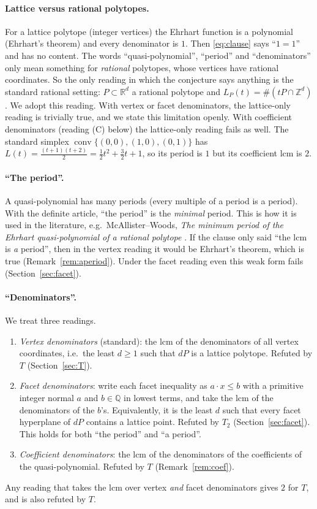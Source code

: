 \documentclass[11pt]{article}
\theoremstyle{definition}
\theoremstyle{remark}
\newcommand{\Z}{\mathbb Z}
\newcommand{\Q}{\mathbb Q}
\newcommand{\conv}{\operatorname{conv}}
\begin{document}
\paragraph{Lattice versus rational polytopes.} For a lattice polytope (integer vertices) the Ehrhart
function is a polynomial (Ehrhart's theorem) and every denominator is $1$. Then
\eqref{eq:clause} says ``$1=1$'' and has no content. The words ``quasi-polynomial'',
``period'' and ``denominators'' only mean something for \emph{rational} polytopes, whose vertices
have rational coordinates. So the only reading in which the conjecture says anything is the
standard rational setting: $P\subset\mathbb R^d$ a rational polytope and $L_P(t)=\#(tP\cap\Z^d)$.
We adopt this reading. With vertex or facet denominators, the lattice-only reading is trivially
true, and we state this limitation openly. With coefficient denominators (reading (C) below) the
lattice-only reading fails as well. The standard simplex $\conv\{(0,0),(1,0),(0,1)\}$ has
$L(t)=\frac{(t+1)(t+2)}{2}=\frac12t^2+\frac32t+1$, so its period is $1$ but its coefficient lcm is $2$.

\paragraph{``The period''.} A quasi-polynomial has many periods (every multiple of a period is a
period). With the definite article, ``the period'' is the \emph{minimal} period. This is how it is
used in the literature, e.g.\ McAllister--Woods, \emph{The minimum period of the Ehrhart
quasi-polynomial of a rational polytope} \cite{MW}. If the clause only said ``the lcm is
\emph{a} period'', then in the vertex reading it would be Ehrhart's theorem, which is true
(Remark~\ref{rem:aperiod}). Under the facet reading even this weak form fails
(Section~\ref{sec:facet}).

\paragraph{``Denominators''.} We treat three readings.
\begin{enumerate}
\item[(V)] \emph{Vertex denominators} (standard): the lcm of the denominators of all vertex
coordinates, i.e.\ the least $d\ge1$ such that $dP$ is a lattice polytope. Refuted by $T$
(Section~\ref{sec:T}).
\item[(F)] \emph{Facet denominators}: write each facet inequality as $a\cdot x\le b$ with a
primitive integer normal $a$ and $b\in\Q$ in lowest terms, and take the lcm of the denominators of
the $b$'s. Equivalently, it is the least $d$ such that every facet hyperplane of $dP$ contains a
lattice point. Refuted by $T_2$ (Section~\ref{sec:facet}). This holds for both ``the period'' and
``a period''.
\item[(C)] \emph{Coefficient denominators}: the lcm of the denominators of the coefficients of the
quasi-polynomial. Refuted by $T$ (Remark~\ref{rem:coef}).
\end{enumerate}
Any reading that takes the lcm over vertex \emph{and} facet denominators gives $2$ for $T$, and is
also refuted by $T$.
\end{document}
